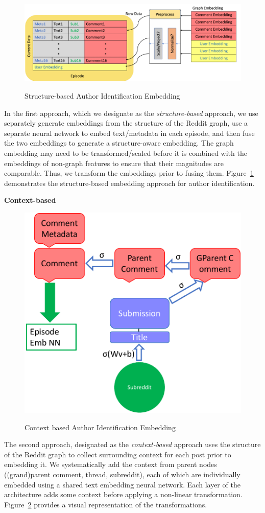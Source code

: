 \begin{figure}
    \centering
    \includegraphics[width=0.9\linewidth,alt={Block diagram of structure-based approach.}]{future_work/figures/reddit_structure_based.pdf}
    \caption{Structure-based Author Identification Embedding}
    \label{fig:future_work:scale:preliminary:reddit_structure_embedding}
\end{figure}
In the first approach, which we designate as the \textit{structure-based} approach, we use separately generate embeddings from the structure of the Reddit graph, use a separate neural network to embed text/metadata in each episode, and then fuse the two embeddings to generate a structure-aware embedding. 
The graph embedding may need to be transformed/scaled before it is combined with the embeddings of non-graph features to ensure that their magnitudes are comparable.
Thus, we transform the embeddings prior to fusing them.
Figure~\ref{fig:future_work:scale:preliminary:reddit_structure_embedding} demonstrates the structure-based embedding approach for author identification.

\textbf{Context-based}
\begin{figure}
    \centering
    \includegraphics[width=0.5\linewidth,alt={Block diagram for context-based approach.}]{future_work/figures/reddit_context_based.pdf}
    \caption{Context based Author Identification Embedding}
    \label{fig:future_work:scale:preliminary:reddit_context_embedding}
\end{figure}
The second approach, designated as the \textit{context-based} approach uses the structure of the Reddit graph to collect surrounding context for each post prior to embedding it. 
We systematically add the context from parent nodes ((grand)parent comment, thread, subreddit), each of which are individually embedded using a shared text embedding neural network.
Each layer of the architecture adds some context before applying a non-linear transformation.
Figure~\ref{fig:future_work:scale:preliminary:reddit_context_embedding} provides a  visual representation of the transformations.

